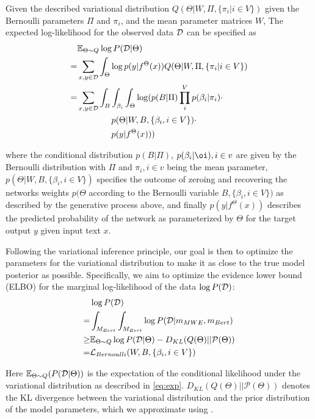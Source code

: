Given the described variational distribution $Q(\Theta | W, \Pi, \{\pi_i | i \in V\})$  given  
the Bernoulli parameters $\Pi$ and $\pi_i$, and the mean parameter matrices $W$,
The expected log-likelihood for the observed data $\mathcal{D}$  can be specified as 
\begin{align}
& \mathbb{E}_{\Theta \sim Q} \log P (\mathcalD | \Theta) \nonumber\\ 
= & \sum_{x, y \in \mathcalD} \int_{\Theta} \log p(y \vert f^{\Theta}(x)) Q(\Theta | W, \Pi, \{\pi_i | i \in V\}) \nonumber\\ 
= & \sum_{x, y \in \mathcalD} \int_B \int_{\beta_i}\int_{\Theta} \log ( p(B | \Pi) \prod_i^{V} p(\beta_i | \pi_i) \cdot \nonumber\\ 
& \quad \quad \quad \quad p(\Theta \vert W, B, \{\beta_i, i \in V\}) \cdot \nonumber\\ 
& \quad \quad \quad \quad p(y \vert f^{\Theta}(x)) )
\label{eq:exp}
\end{align}

where the conditional distribution 
$p(B | \Pi)$, $p(\beta_i | \oi), i\in v$ are given by the Bernoulli distribution with $\Pi$ and $\pi_i, i\in v$ being the mean parameter, 
$p(\Theta \vert W, B, \{\beta_i, i \in V\})$ specifies the outcome of zeroing and recovering the networks weights $p(\Theta$ according to the Bernoulli variable $B, \{\beta_i, i \in V\})$ as described by the generative process above,
and finally $p(y \vert f^{\Theta}(x))$ describes the predicted probability of the network as parameterized by $\Theta$ for the target output $y$ given input text $x$. 


Following the variational inference principle, our goal is then to optimize the parameters for the variational distribution to make it as close to the true model posterior as possible. Specifically, we aim to optimize the evidence lower bound (ELBO) for the marginal log-likelihood of the data $\log P( \mathcal{D} )$: 
\begin{align}
    &\log P( \mathcalD ) \nonumber\\
    = & \int_{M_{Bert}} \int_{M_{Bert}} \log P( \mathcalD | m_{MWE}, m_{Bert} ) \nonumber\\
    \geq& \mathbb{E}_{\Theta \sim Q} \log P (\mathcalD | \Theta) - D_{KL}(Q( \Theta) ||\mathcal{P}( \Theta)) \nonumber\\
    = & \mathcal{L}_{Bernoulli} (W, B, \{\beta_i, i \in V\}) \label{eq:elbo0}
\end{align}

Here $\mathbb{E}_{\Theta \sim Q} (P (\mathcal{D} | \Theta) )$ is the expectation of the conditional likelihood under the variational distribution as described in \autoref{eq:exp}. $D_{KL}(Q( \Theta) ||\mathcal{P}( \Theta))$ denotes the KL divergence between the variational distribution and the prior distribution of the model parameters, which we approximate using \cite{gal2016uncertainty}.

